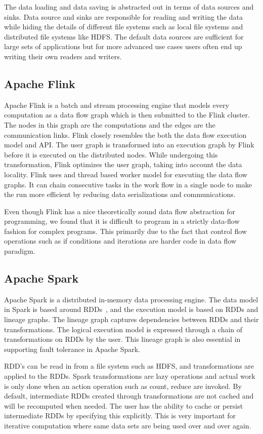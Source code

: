 \documentclass[conference]{IEEEtran}
\begin{document}
The data loading and data saving is abstracted out in terms of data sources and sinks. Data source and sinks are responsible for reading and writing the data while hiding the details of different file systems such as local file systems and distributed file systems like HDFS. The default data sources are sufficient for large sets of applications but for more advanced use cases users often end up writing their own readers and writers. 

\subsection{Apache Flink}

Apache Flink is a batch and stream processing engine that models every computation as a data flow graph which is then submitted to the Flink cluster. The nodes in this graph are the computations and the edges are the communication links. Flink closely resembles the both the data flow execution model and API. The user graph is transformed into an execution graph by Flink before it is executed on the distributed nodes. While undergoing this transformation, Flink optimizes the user graph, taking into account the data locality. Flink uses and thread based worker model for executing the data flow graphs. It can chain consecutive tasks in the work flow in a single node to make the run more efficient by reducing data serializations and communications.

Even though Flink has a nice theoretically sound data flow abstraction for programming, we found that it is difficult to program in a strictly data-flow fashion for complex programs. This primarily due to the fact that control flow operations such as if conditions and iterations are harder code in data flow paradigm.

\subsection{Apache Spark}

Apache Spark is a distributed in-memory data processing engine. The data model in Spark is based around RDDs~\cite{zaharia2012resilient}, and the execution model is based on RDDs and lineage graphs. The lineage graph captures dependencies between RDDs and their transformations. The logical execution model is expressed through a chain of transformations on RDDs by the user. This lineage graph is also essential in supporting fault tolerance in Apache Spark.

RDD's can be read in from a file system such as HDFS, and transformations are applied to the RDDs. Spark transformations are lazy operations and actual work is only done when an action operation such as count, reduce are invoked. By default, intermediate RDDs created through transformations are not cached and will be recomputed when needed. The user has the ability to cache or persist intermediate RDDs by specifying this explicitly. This is very important for iterative computation where same data sets are being used over and over again.  
\end{document}
